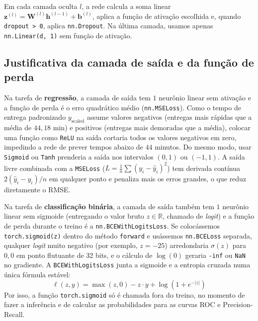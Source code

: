 \documentclass[12pt,a4paper]{article}
\begin{document}
Em cada camada oculta $l$, a rede calcula a soma linear $\mathbf{z}^{(l)} = \mathbf{W}^{(l)}\mathbf{h}^{(l-1)} + \mathbf{b}^{(l)}$, aplica a função de ativação escolhida e, quando \texttt{dropout > 0}, aplica \texttt{nn.Dropout}. Na última camada, usamos apenas \texttt{nn.Linear(d, 1)} sem função de ativação.

\subsection{Justificativa da camada de saída e da função de perda}

Na tarefa de \textbf{regressão}, a camada de saída tem $1$ neurônio linear sem ativação e a função de perda é o erro quadrático médio (\texttt{nn.MSELoss}). Como o tempo de entrega padronizado $y_{\text{scaled}}$ assume valores negativos (entregas mais rápidas que a média de $44{,}18\text{ min}$) e positivos (entregas mais demoradas que a média), colocar uma função como \texttt{ReLU} na saída cortaria todos os valores negativos em zero, impedindo a rede de prever tempos abaixo de $44$ minutos. Do mesmo modo, usar \texttt{Sigmoid} ou \texttt{Tanh} prenderia a saída nos intervalos $(0, 1)$ ou $(-1, 1)$. A saída livre combinada com a \texttt{MSELoss} ($L = \frac{1}{n}\sum (y_i - \hat{y}_i)^2$) tem derivada contínua $2(\hat{y}_i - y_i)/n$ em qualquer ponto e penaliza mais os erros grandes, o que reduz diretamente o RMSE.

Na tarefa de \textbf{classificação binária}, a camada de saída também tem $1$ neurônio linear sem sigmoide (entregando o valor bruto $z \in \mathbb{R}$, chamado de \textit{logit}) e a função de perda durante o treino é a \texttt{nn.BCEWithLogitsLoss}. Se colocássemos \texttt{torch.sigmoid(z)} dentro do método \texttt{forward} e usássemos \texttt{nn.BCELoss} separada, qualquer \textit{logit} muito negativo (por exemplo, $z = -25$) arredondaria $\sigma(z)$ para $0{,}0$ em ponto flutuante de 32 bits, e o cálculo de $\log(0)$ geraria \texttt{-inf} ou \texttt{NaN} no gradiente. A \texttt{BCEWithLogitsLoss} junta a sigmoide e a entropia cruzada numa única fórmula estável:
\begin{equation}
    \ell(z, y) = \max(z, 0) - z \cdot y + \log\!\left(1 + e^{-|z|}\right)
\end{equation}
Por isso, a função \texttt{torch.sigmoid} só é chamada fora do treino, no momento de fazer a inferência e de calcular as probabilidades para as curvas ROC e Precision-Recall.
\end{document}
